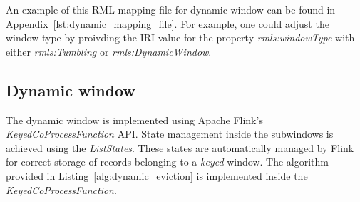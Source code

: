 An example of this RML mapping file for 
dynamic window can 
be found in Appendix~\ref{lst:dynamic_mapping_file}. 
For example, one could 
adjust the window type by proivding the IRI value for the property 
\emph{rmls:windowType} with either \emph{rmls:Tumbling} or \emph{rmls:DynamicWindow}. 


\subsection{Dynamic window}
The dynamic window is implemented using Apache Flink's 
\emph{KeyedCoProcessFunction} API. State management inside the 
subwindows is achieved using the \emph{ListStates}. These 
states are automatically managed by Flink for correct storage of 
records belonging to a \emph{keyed} window. The algorithm provided 
in Listing~\ref{alg:dynamic_eviction} is implemented inside the 
\emph{KeyedCoProcessFunction}. 
